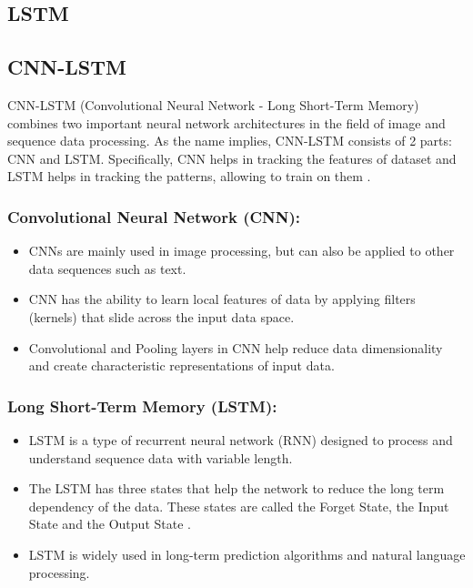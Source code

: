 \documentclass[conference]{IEEEtran}
\begin{document}
\subsection{LSTM}



\subsection{CNN-LSTM}
CNN-LSTM (Convolutional Neural Network - Long Short-Term Memory) combines two important neural network architectures in the field of image and sequence data processing.
As the name implies, CNN-LSTM consists of 2 parts: CNN and LSTM. Specifically, CNN helps in tracking the features of dataset and LSTM helps in tracking the patterns, allowing to train on them \cite{PredictStockCNNLSTM}. \\
\subsubsection{Convolutional Neural Network (CNN):}
\begin{itemize}
    \item CNNs are mainly used in image processing, but can also be applied to other data sequences such as text.
    \item CNN has the ability to learn local features of data by applying filters (kernels) that slide across the input data space.
    \item Convolutional and Pooling layers in CNN help reduce data dimensionality and create characteristic representations of input data.
\end{itemize}

\subsubsection{Long Short-Term Memory (LSTM):}
\begin{itemize}
    \item LSTM is a type of recurrent neural network (RNN) designed to process and understand sequence data with variable length.
    \item The LSTM has three states that help the network to reduce the long term dependency of the data. These states are called the Forget State, the Input State and the Output State \cite{ComparasionCNNLSTM}.
    \item LSTM is widely used in long-term prediction algorithms and natural language processing.
\end{itemize}
\end{document}
